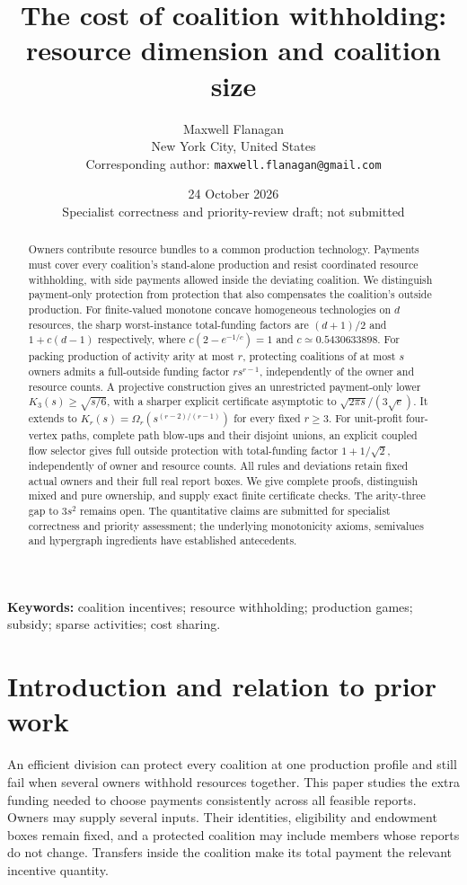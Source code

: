 \documentclass[11pt]{article}
\title{The cost of coalition withholding:\\resource dimension and coalition size}
\author{Maxwell Flanagan\\[2pt]\small New York City, United States\\[2pt]
\small Corresponding author: \texttt{maxwell.flanagan@gmail.com}}
\date{24 October 2026\\\small Specialist correctness and priority-review draft; not submitted}
\theoremstyle{definition}\newtheorem{definition}[theorem]{Definition}
\theoremstyle{remark}\newtheorem{remark}[theorem]{Remark}
\begin{document}
\maketitle
\begin{abstract}
Owners contribute resource bundles to a common production technology. Payments
must cover every coalition's stand-alone production and resist coordinated
resource withholding, with side payments allowed inside the deviating coalition.
We distinguish payment-only protection from protection that also compensates
the coalition's outside production. For finite-valued monotone concave
homogeneous technologies on $d$ resources, the sharp worst-instance total-funding
factors are $(d+1)/2$ and $1+c(d-1)$ respectively, where
$c(2-e^{-1/c})=1$ and $c\simeq0.5430633898$.
For packing production of activity arity at most $r$, protecting coalitions of
at most $s$ owners admits a full-outside funding factor $rs^{r-1}$,
independently of the owner and resource counts.
A projective construction gives an unrestricted payment-only lower
$K_3(s)\ge\sqrt{s/6}$, with a sharper explicit certificate asymptotic to
$\sqrt{2\pi s}/(3\sqrt e)$. It extends to
$K_r(s)=\Omega_r(s^{(r-2)/(r-1)})$ for every fixed $r\ge3$.
For unit-profit four-vertex paths, complete path blow-ups and their disjoint
unions, an explicit coupled flow selector gives full outside protection with
total-funding factor $1+1/\sqrt2$, independently of owner and resource counts.
All rules and deviations retain fixed actual owners and their full real report
boxes. We give complete proofs, distinguish mixed and pure ownership, and
supply exact finite certificate checks. The arity-three gap to $3s^2$ remains
open. The quantitative claims are submitted for specialist correctness and
priority assessment; the underlying monotonicity axioms, semivalues and
hypergraph ingredients have established antecedents.
\end{abstract}
\smallskip
\noindent\textbf{Keywords:} coalition incentives; resource withholding;
production games; subsidy; sparse activities; cost sharing.
\clearpage
\tableofcontents
\newpage

\section{Introduction and relation to prior work}\label{sec:intro}
An efficient division can protect every coalition at one production profile
and still fail when several owners withhold resources together. This paper
studies the extra funding needed to choose payments consistently across all
feasible reports. Owners may supply several inputs. Their identities,
eligibility and endowment boxes remain fixed, and a protected coalition may
include members whose reports do not change. Transfers inside the coalition
make its total payment the relevant incentive quantity.
\end{document}
